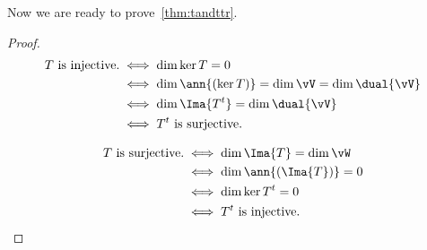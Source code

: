 Now we are ready to prove~\ref{thm:tandttr}.
\begin{proof}
    \begin{align*}
	\text{$T$ is injective.} &\iff \dim{\ker{T}} = 0\\
	&\iff \dim\ann{(\ker{T})} = \dim{\vV} = \dim{\dual{\vV}}\\
	&\iff \dim\Ima{T^{t}} = \dim{\dual{\vV}}\\
	&\iff \text{$T^{t}$ is surjective.}
    \end{align*}

        \begin{align*}
	\text{$T$ is surjective.} &\iff \dim{\Ima{T}} = \dim{\vW}\\
	&\iff \dim\ann{(\Ima{T})} = 0\\
	&\iff \dim\ker{T^{t}} = 0\\
	&\iff \text{$T^{t}$ is injective.}
    \end{align*}

\end{proof}
\endinput

